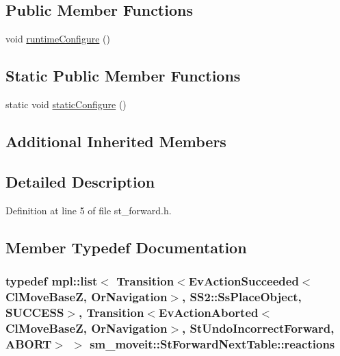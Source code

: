 \subsection*{Public Member Functions}
\begin{DoxyCompactItemize}
\item 
void \hyperlink{structsm__moveit_1_1StForwardNextTable_a4f6c466efdb91b0eb9aaee71f87a4fc4}{runtime\+Configure} ()
\end{DoxyCompactItemize}
\subsection*{Static Public Member Functions}
\begin{DoxyCompactItemize}
\item 
static void \hyperlink{structsm__moveit_1_1StForwardNextTable_a2f28979d2a049e53b91802421771bcfb}{static\+Configure} ()
\end{DoxyCompactItemize}
\subsection*{Additional Inherited Members}


\subsection{Detailed Description}


Definition at line 5 of file st\+\_\+forward.\+h.



\subsection{Member Typedef Documentation}
\subsubsection[{\texorpdfstring{reactions}{reactions}}]{\setlength{\rightskip}{0pt plus 5cm}typedef mpl\+::list$<$ Transition$<$Ev\+Action\+Succeeded$<${\bf Cl\+Move\+BaseZ}, {\bf Or\+Navigation}$>$, {\bf S\+S2\+::\+Ss\+Place\+Object}, {\bf S\+U\+C\+C\+E\+SS}$>$, Transition$<$Ev\+Action\+Aborted$<${\bf Cl\+Move\+BaseZ}, {\bf Or\+Navigation}$>$, {\bf St\+Undo\+Incorrect\+Forward}, {\bf A\+B\+O\+RT}$>$ $>$ {\bf sm\+\_\+moveit\+::\+St\+Forward\+Next\+Table\+::reactions}}\hypertarget{structsm__moveit_1_1StForwardNextTable_a00ed94e86d9c85581a167cfdf8e9dbfe}{}\label{structsm__moveit_1_1StForwardNextTable_a00ed94e86d9c85581a167cfdf8e9dbfe}


